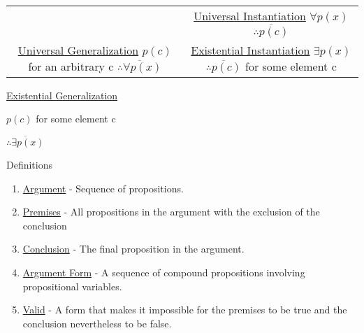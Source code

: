 \documentclass[12pt]{article}
\begin{document}
\begin{center}
\begin{tabular}{ c c }
&

\makecell{ \underline{Universal Instantiation} \\ $\forall p(x)$ \\ $\overline{\therefore{p(c)}}$ \\ \quad }

\\

\makecell{ \underline{Universal Generalization} \\ $p(c)$ for an arbitrary c \\ $\overline{\therefore{\forall p(x)}}$ \\ \quad}

&

\makecell{ \underline{Existential Instantiation} \\ $\exists p(x)$ \\ $\overline{\therefore{p(c)}}$ for some element c \\ \quad}

   
\end{tabular}

\quad

\quad

\underline{Existential Generalization}

$p(c)$ for some element c

 $\overline{\therefore{\exists p(x)}}$ 

\end{center}


Definitions
\begin{enumerate}
\item \underline{Argument} - Sequence of propositions.
\item \underline{Premises} - All propositions in the argument with the exclusion of the conclusion
\item \underline{Conclusion} - The final proposition in the argument.
\item \underline{Argument Form} - A sequence of compound propositions involving propositional variables.
\item \underline{Valid} - A form that makes it impossible for the premises to be true and the conclusion nevertheless to be false.
\end{enumerate}
\end{document}
